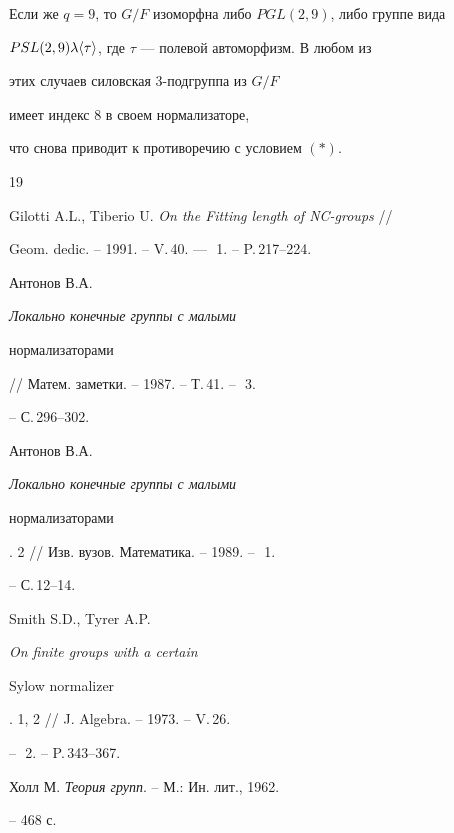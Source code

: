 Если же $q=9$, то $G/F$ изоморфна либо $PGL(2,9)$, либо группе вида


$PSL(2,9)\lambda\langle\tau\rangle$, где $\tau$ --- полевой автоморфизм. В любом из


этих случаев силовская 3-подгруппа из $G/F$


имеет индекс 8 в своем нормализаторе,


что снова приводит к противоречию с условием $(\ast)$.








\begin{thebibliography}{19}







Gilotti A.L., Tiberio U. {\em On the Fitting length of NC-groups} //


Geom. dedic. -- 1991. -- V.\,40. --- \No\,\,1. -- P.\,217--224.







Антонов В.А. {\em Локально конечные группы с малыми


нормализаторами} // Матем. заметки. -- 1987. -- Т.\,41. -- \No\,\,3.


-- С.\,296--302.







Антонов В.А. {\em Локально конечные группы с малыми


нормализаторами}. 2 // Изв. вузов. Математика. -- 1989. -- \No\,\,1.


-- С.\,12--14.







Smith S.D., Tyrer A.P. {\em On finite groups with a certain


Sylow normalizer}. 1, 2 // J. Algebra. -- 1973. -- V.\,26.


-- \No\,\,2. -- P.\,343--367.







Холл М. {\em Теория групп}. -- М.: Ин. лит., 1962.


-- 468 с.






\end{thebibliography}

